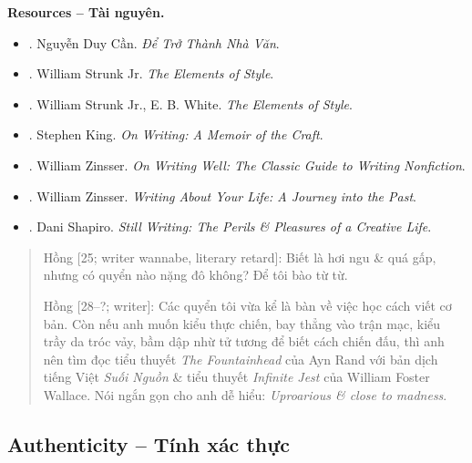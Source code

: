 \documentclass[12pt]{article}
\begin{document}
\noindent\textbf{\textsf{Resources -- Tài nguyên.}}
\begin{itemize}
	\item \cite{Can_dtnv}. Nguyễn Duy Cần. {\it Để Trở Thành Nhà Văn}.
	\item \cite{Strunk1918}. William Strunk Jr. {\it The Elements of Style}.
	\item \cite{Strunk_White2019}. William Strunk Jr., E. B. White. {\it The Elements of Style}.
	\item \cite{King2000,King2010}. Stephen King. {\it On Writing: A Memoir of the Craft}.
	\item \cite{Zinsser2001,Zinsser2016}. William Zinsser. {\it On Writing Well: The Classic Guide to Writing Nonfiction}.
	\item \cite{Zinsser2005}. William Zinsser. {\it Writing About Your Life: A Journey into the Past}.
	\item \cite{Shapiro2014}. Dani Shapiro. {\it Still Writing: The Perils \& Pleasures of a Creative Life}.
\end{itemize}

\begin{quote}
	{\sf Hồng [25; writer wannabe, literary retard]}: Biết là hơi ngu \& quá gấp, nhưng có quyển nào nặng đô không? Để tôi bào từ từ.
	
	{\sf Hồng [28--?; writer]}: Các quyển tôi vừa kể là bàn về việc học cách viết cơ bản. Còn nếu anh muốn kiểu thực chiến, bay thẳng vào trận mạc, kiểu trầy da tróc vảy, bầm dập nhừ tử tương để biết cách chiến đấu, thì anh nên tìm đọc tiểu thuyết {\it The Fountainhead} của {\sc Ayn Rand} với bản dịch tiếng Việt {\it Suối Nguồn} \cite{Rand_fountainhead} \& tiểu thuyết {\it Infinite Jest} \cite{Wallace2011} của {\sc William Foster Wallace}. Nói ngắn gọn cho anh dễ hiểu: {\it Uproarious \& close to madness}.
\end{quote}

\subsection{Authenticity -- Tính xác thực}
\end{document}

